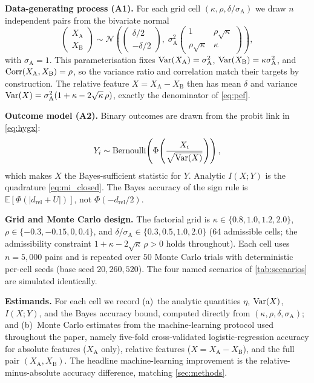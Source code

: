 \textbf{Data-generating process (A1).} For each grid cell $(\kappa,\rho,\delta/\sigma_{\mathrm{A}})$ we draw $n$ independent pairs from the bivariate normal
\begin{equation}
  \begin{pmatrix}X_{\mathrm{A}}\\[2pt] X_{\mathrm{B}}\end{pmatrix}
  \sim \mathcal{N}\!\left(
  \begin{pmatrix}\delta/2\\[2pt] -\delta/2\end{pmatrix},\;
  \sigma_{\mathrm{A}}^{2}
  \begin{pmatrix}1 & \rho\sqrt{\kappa}\\[2pt] \rho\sqrt{\kappa} & \kappa\end{pmatrix}
  \right),
  \label{eq:si_dgp}
\end{equation}
with $\sigma_{\mathrm{A}}=1$. This parameterisation fixes $\operatorname{Var}(X_{\mathrm{A}})=\sigma_{\mathrm{A}}^{2}$, $\operatorname{Var}(X_{\mathrm{B}})=\kappa\sigma_{\mathrm{A}}^{2}$, and $\operatorname{Corr}(X_{\mathrm{A}},X_{\mathrm{B}})=\rho$, so the variance ratio and correlation match their targets by construction. The relative feature $X=X_{\mathrm{A}}-X_{\mathrm{B}}$ then has mean $\delta$ and variance $\operatorname{Var}(X)=\sigma_{\mathrm{A}}^{2}(1+\kappa-2\sqrt{\kappa}\,\rho)$, exactly the denominator of \cref{eq:pef}.

\textbf{Outcome model (A2).} Binary outcomes are drawn from the probit link in \cref{eq:hygx}:
\begin{equation}
  Y_{i} \sim \mathrm{Bernoulli}\!\left(\Phi\!\left(\frac{X_{i}}{\sqrt{\operatorname{Var}(X)}}\right)\right),
  \label{eq:si_outcome}
\end{equation}
which makes $X$ the Bayes-sufficient statistic for $Y$. Analytic $I(X;Y)$ is the quadrature \cref{eq:mi_closed}. The Bayes accuracy of the sign rule is $\mathbb{E}[\Phi(|d_{\mathrm{rel}}+U|)]$, not $\Phi(-d_{\mathrm{rel}}/2)$.

\textbf{Grid and Monte Carlo design.} The factorial grid is $\kappa\in\{0.8,1.0,1.2,2.0\}$, $\rho\in\{-0.3,-0.15,0,0.4\}$, and $\delta/\sigma_{\mathrm{A}}\in\{0.3,0.5,1.0,2.0\}$ (64 admissible cells; the admissibility constraint $1+\kappa-2\sqrt{\kappa}\,\rho>0$ holds throughout). Each cell uses $n=5{,}000$ pairs and is repeated over $50$ Monte Carlo trials with deterministic per-cell seeds (base seed $20{,}260{,}520$). The four named scenarios of \cref{tab:scenarios} are simulated identically.

\textbf{Estimands.} For each cell we record (a)~the analytic quantities $\eta$, $\operatorname{Var}(X)$, $I(X;Y)$, and the Bayes accuracy bound, computed directly from $(\kappa,\rho,\delta,\sigma_{\mathrm{A}})$; and (b)~Monte Carlo estimates from the machine-learning protocol used throughout the paper, namely five-fold cross-validated logistic-regression accuracy for absolute features ($X_{\mathrm{A}}$ only), relative features ($X=X_{\mathrm{A}}-X_{\mathrm{B}}$), and the full pair $(X_{\mathrm{A}},X_{\mathrm{B}})$. The headline machine-learning improvement is the relative-minus-absolute accuracy difference, matching \cref{sec:methods}.

